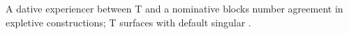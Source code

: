 
A dative experiencer between T and a nominative blocks number agreement in expletive constructions; T surfaces with default singular \citep{holmberg2003}.
